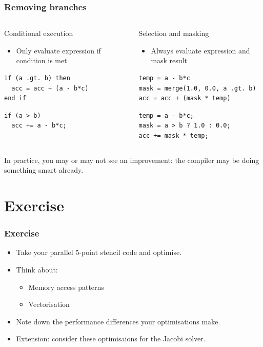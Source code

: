 \documentclass{beamer}
\begin{document}
\begin{frame}[fragile]
\frametitle{Removing branches}
\begin{columns}

\begin{column}{0.5\textwidth}
Conditional execution
\begin{itemize}
  \item Only evaluate expression if condition is met
\end{itemize}
\begin{verbatim}
if (a .gt. b) then
  acc = acc + (a - b*c)
end if
\end{verbatim}

\begin{verbatim}
if (a > b)
  acc += a - b*c;
\end{verbatim}
\end{column}

\begin{column}{0.5\textwidth}
Selection and masking
\begin{itemize}
  \item Always evaluate expression and mask result
\end{itemize}
\begin{verbatim}
temp = a - b*c
mask = merge(1.0, 0.0, a .gt. b)
acc = acc + (mask * temp)
\end{verbatim}

\begin{verbatim}
temp = a - b*c;
mask = a > b ? 1.0 : 0.0;
acc += mask * temp;
\end{verbatim}
\end{column}

\end{columns}
In practice, you may or may not see an improvement: the compiler may be doing something smart already.
\end{frame}

\section{Exercise}
\begin{frame}
\frametitle{Exercise}
\begin{itemize}
  \item Take your parallel 5-point stencil code and optimise.
  \item Think about:
    \begin{itemize}
      \item Memory access patterns
      \item Vectorisation
    \end{itemize}
  \item Note down the performance differences your optimisations make.
  \item Extension: consider these optimisaions for the Jacobi solver.
\end{itemize}
\end{frame}

\end{document}
